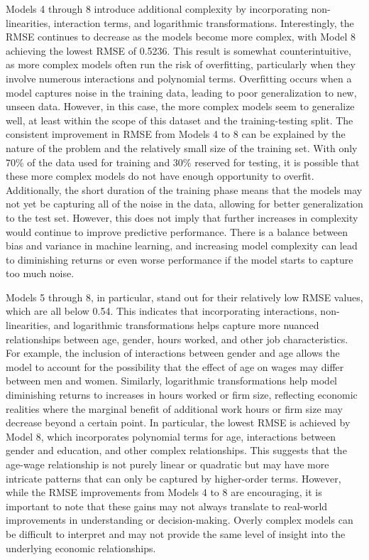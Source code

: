 \documentclass[11pt,a4paper,onecolumn]{article}
\begin{document}
        Models 4 through 8 introduce additional complexity by incorporating non-linearities, interaction terms, and logarithmic transformations. Interestingly, the RMSE continues to decrease as the models become more complex, with Model 8 achieving the lowest RMSE of 0.5236. This result is somewhat counterintuitive, as more complex models often run the risk of overfitting, particularly when they involve numerous interactions and polynomial terms. Overfitting occurs when a model captures noise in the training data, leading to poor generalization to new, unseen data. However, in this case, the more complex models seem to generalize well, at least within the scope of this dataset and the training-testing split. The consistent improvement in RMSE from Models 4 to 8 can be explained by the nature of the problem and the relatively small size of the training set. With only 70\% of the data used for training and 30\% reserved for testing, it is possible that these more complex models do not have enough opportunity to overfit. Additionally, the short duration of the training phase means that the models may not yet be capturing all of the noise in the data, allowing for better generalization to the test set. However, this does not imply that further increases in complexity would continue to improve predictive performance. There is a balance between bias and variance in machine learning, and increasing model complexity can lead to diminishing returns or even worse performance if the model starts to capture too much noise.
        
        Models 5 through 8, in particular, stand out for their relatively low RMSE values, which are all below 0.54. This indicates that incorporating interactions, non-linearities, and logarithmic transformations helps capture more nuanced relationships between age, gender, hours worked, and other job characteristics. For example, the inclusion of interactions between gender and age allows the model to account for the possibility that the effect of age on wages may differ between men and women. Similarly, logarithmic transformations help model diminishing returns to increases in hours worked or firm size, reflecting economic realities where the marginal benefit of additional work hours or firm size may decrease beyond a certain point. In particular, the lowest RMSE is achieved by Model 8, which incorporates polynomial terms for age, interactions between gender and education, and other complex relationships. This suggests that the age-wage relationship is not purely linear or quadratic but may have more intricate patterns that can only be captured by higher-order terms. However, while the RMSE improvements from Models 4 to 8 are encouraging, it is important to note that these gains may not always translate to real-world improvements in understanding or decision-making. Overly complex models can be difficult to interpret and may not provide the same level of insight into the underlying economic relationships.
    
\end{document}
